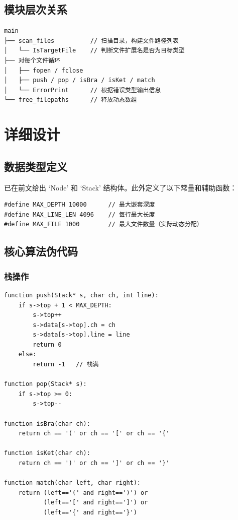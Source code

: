 \documentclass[UTF8]{ctexart}
\begin{document}
\subsection{模块层次关系}
\begin{verbatim}
main
├── scan_files          // 扫描目录，构建文件路径列表
│   └── IsTargetFile    // 判断文件扩展名是否为目标类型
├── 对每个文件循环
│   ├── fopen / fclose
│   ├── push / pop / isBra / isKet / match
│   └── ErrorPrint      // 根据错误类型输出信息
└── free_filepaths      // 释放动态数组
\end{verbatim}

\section{详细设计}

\subsection{数据类型定义}
已在前文给出 ‘Node’ 和 ‘Stack’ 结构体。此外定义了以下常量和辅助函数：
\begin{lstlisting}
#define MAX_DEPTH 10000      // 最大嵌套深度
#define MAX_LINE_LEN 4096    // 每行最大长度
#define MAX_FILE 1000        // 最大文件数量（实际动态分配）
\end{lstlisting}

\subsection{核心算法伪代码}

\subsubsection{栈操作}
\begin{lstlisting}
function push(Stack* s, char ch, int line):
    if s->top + 1 < MAX_DEPTH:
        s->top++
        s->data[s->top].ch = ch
        s->data[s->top].line = line
        return 0
    else:
        return -1   // 栈满

function pop(Stack* s):
    if s->top >= 0:
        s->top--

function isBra(char ch):
    return ch == '(' or ch == '[' or ch == '{'

function isKet(char ch):
    return ch == ')' or ch == ']' or ch == '}'

function match(char left, char right):
    return (left=='(' and right==')') or
           (left=='[' and right==']') or
           (left=='{' and right=='}')
\end{lstlisting}
\end{document}
